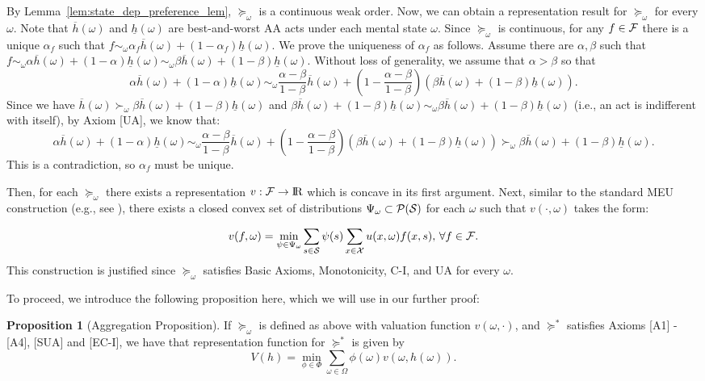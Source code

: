 \documentclass[11pt,oneside]{article}
\theoremstyle{plain}
\theoremstyle{plain}
\theoremstyle{plain}
\theoremstyle{plain}
\theoremstyle{plain}
\theoremstyle{definition}
\theoremstyle{definition}
\newtheorem{prop}{Proposition}
\theoremstyle{remark}
\theoremstyle{plain}
\newcommand{\R}{{\rm I\!R}}
\newcommand{\F}{{\cal F}}
\newcommand{\ulh}{\underline{h}}
\newcommand{\olh}{\overline{h}}
\newcommand{\pfo}{\pf_\omega}
\newcommand{\calps}{{\cal P}({\cal S})}
\newcommand{\mcx}{{\cal X}}
\newcommand{\pf}{\succeq}
\newcommand{\pfs}{\succeq^*}
\newcommand{\convexmix}[3]{#3 #1 + (1-#3) #2}
\begin{document}
By Lemma~\ref{lem:state_dep_preference_lem},
$\pf_\omega$ is a continuous weak order. 
Now, we can obtain a representation result for $\pf_\omega$ for every $\omega$. 
Note that $\olh(\omega)$ and $\ulh(\omega)$ are best-and-worst AA acts under each mental state $\omega$. Since $\pfo$ is continuous, for any $f\in \F$ there is a unique $\alpha_f$ such that
$f \sim_\omega \convexmix{\olh(\omega)}{\ulh(\omega)}{\alpha_f}$. We prove the uniqueness of $\alpha_f$ as follows.
Assume there are $\alpha,\beta$ such that $f \sim_\omega \convexmix{\olh(\omega)}{\ulh(\omega)}{\alpha}  \sim_\omega \convexmix{\olh(\omega)}{\ulh(\omega)}{\beta}$.
Without loss of generality, we assume that $\alpha > \beta$ so that
$$
\convexmix{\olh(\omega)}{\ulh(\omega)}{\alpha} \sim_\omega \convexmix{\olh(\omega)}{\left( \convexmix{\olh(\omega)}{\ulh(\omega)}{\beta} \right)}{\frac{\alpha -\beta}{1-\beta}}.
$$
Since we have $\olh(\omega) \succ_\omega \convexmix{\olh(\omega)}{\ulh(\omega)}{\beta}$ and
$\convexmix{\olh(\omega)}{\ulh(\omega)}{\beta} \sim_\omega \convexmix{\olh(\omega)}{\ulh(\omega)}{\beta}$ (i.e., an act is indifferent with itself), by Axiom [UA], we know that:
$$
\convexmix{\olh(\omega)}{\ulh(\omega)}{\alpha} \sim_\omega \convexmix{\olh(\omega)}{\left( \convexmix{\olh(\omega)}{\ulh(\omega)}{\beta} \right)}{\frac{\alpha -\beta}{1-\beta}} \succ_\omega \convexmix{\olh(\omega)}{\ulh(\omega)}{\beta}.
$$
This is a contradiction, so $\alpha_f$ must be unique.

Then, for each $\pf_\omega$ there exists a representation $v:\F \to \R$ which is concave in its first argument.
Next, similar to the standard MEU construction (e.g., see \cite{gilboa1989maxmin}), there exists a closed convex set of distributions $\Psi_\omega \subset \calps$ for each $\omega$ such that $v(\cdot,\omega)$ takes the form:

\[
v(f,\omega) = \min_{\psi \in \Psi_\omega} \sum_{s \in \mathcal{S}} \psi(s) \sum_{x \in \mcx}u(x,\omega)f(x,s),\, \forall f \in \F.
\]
This construction is justified since $\pfo$ satisfies Basic Axioms, Monotonicity, C-I, and UA for every $\omega$.

To proceed, we introduce the following proposition here, which we will use in our further proof:
\begin{prop}[Aggregation Proposition]
    \label{prop:aggregation_proposition}
    If $\pfo$ is defined as above with valuation function $v(\omega,\cdot)$, and $\pfs$ satisfies Axioms [A1] - [A4], [SUA] and [EC-I], we have
    that representation function for $\pfs$ is given by
    \[
    V(h) = \min_{\phi \in \Phi} \sum_{\omega \in \Omega} \phi(\omega) v\left(\omega,h(\omega)\right).
    \]
\end{prop}
\end{document}
